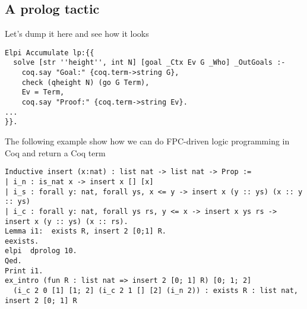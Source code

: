 \subsection{A prolog tactic}

\begin{metanote}
  Let's dump it here and see how it looks
\end{metanote}

\begin{lstlisting}
Elpi Accumulate lp:{{
  solve [str ''height'', int N] [goal _Ctx Ev G _Who] _OutGoals :-
    coq.say "Goal:" {coq.term->string G},
    check (qheight N) (go G Term),
    Ev = Term,
    coq.say "Proof:" {coq.term->string Ev}.
...
}}.
\end{lstlisting}
The following example show how we can do FPC-driven logic programming in Coq and return
a Coq term
\begin{lstlisting}
Inductive insert (x:nat) : list nat -> list nat -> Prop :=
| i_n : is_nat x -> insert x [] [x]
| i_s : forall y: nat, forall ys, x <= y -> insert x (y :: ys) (x :: y :: ys)
| i_c : forall y: nat, forall ys rs, y <= x -> insert x ys rs -> insert x (y :: ys) (x :: rs).
Lemma i1:  exists R, insert 2 [0;1] R.
eexists.
elpi  dprolog 10.
Qed.
Print i1.
ex_intro (fun R : list nat => insert 2 [0; 1] R) [0; 1; 2]
  (i_c 2 0 [1] [1; 2] (i_c 2 1 [] [2] (i_n 2)) : exists R : list nat, insert 2 [0; 1] R
\end{lstlisting}

%

